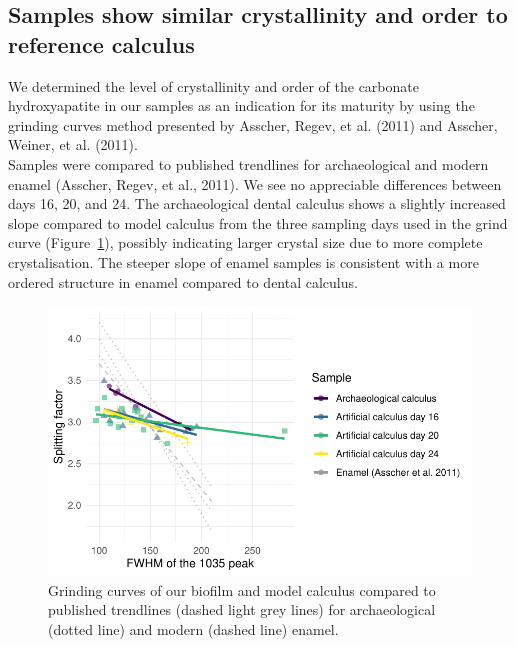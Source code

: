 \documentclass[
]{article}
\begin{document}
\hypertarget{samples-show-similar-crystallinity-and-order-to-reference-calculus}{%
\subsection{Samples show similar crystallinity and order to reference
calculus}\label{samples-show-similar-crystallinity-and-order-to-reference-calculus}}

We determined the level of crystallinity and order of the carbonate
hydroxyapatite in our samples as an indication for its maturity by using
the grinding curves method presented by Asscher, Regev, et al. (2011)
and Asscher, Weiner, et al. (2011).\\
Samples were compared to published trendlines for archaeological and
modern enamel (Asscher, Regev, et al., 2011). We see no appreciable
differences between days 16, 20, and 24. The archaeological dental
calculus shows a slightly increased slope compared to model calculus
from the three sampling days used in the grind curve
(Figure~\ref{fig-grind-curve}), possibly indicating larger crystal size
due to more complete crystalisation. The steeper slope of enamel samples
is consistent with a more ordered structure in enamel compared to dental
calculus.

\begin{figure}

{\centering \includegraphics{index_files/figure-pdf/fig-grind-curve-1.pdf}

}

\caption{\label{fig-grind-curve}Grinding curves of our biofilm and model
calculus compared to published trendlines (dashed light grey lines) for
archaeological (dotted line) and modern (dashed line) enamel.}

\end{figure}
\end{document}
